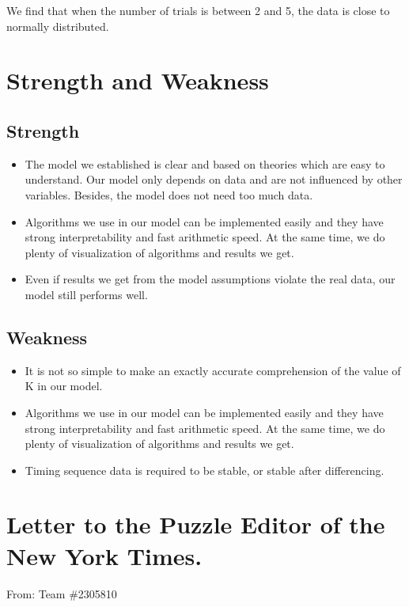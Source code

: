 \documentclass{mcmthesis}
\begin{document}
\noindent We find that when the number of trials is between 2 and 5, the data is close to normally distributed.

\section{Strength and Weakness}

\subsection{Strength}

\begin{itemize}
    \item The model we established is clear and based on theories which are easy to understand. Our model only depends on data and are not influenced by other variables. Besides, the model does not need too much data.
    \item Algorithms we use in our model can be implemented easily and they have strong interpretability and fast arithmetic speed. At the same time, we do plenty of visualization of algorithms and results we get.
    \item Even if results we get from the model assumptions violate the real data, our model still performs well.
\end{itemize}

\subsection{Weakness}

\begin{itemize}
    \item It is not so simple to make an exactly accurate comprehension of the value of K in our model.\item Algorithms we use in our model can be implemented easily and they have strong interpretability and fast arithmetic speed. At the same time, we do plenty of visualization of algorithms and results we get.
    \item Timing sequence data is required to be stable, or stable after differencing.
\end{itemize}

\section{Letter to the Puzzle Editor of the New York Times.}
From: Team \#2305810
\end{document}

